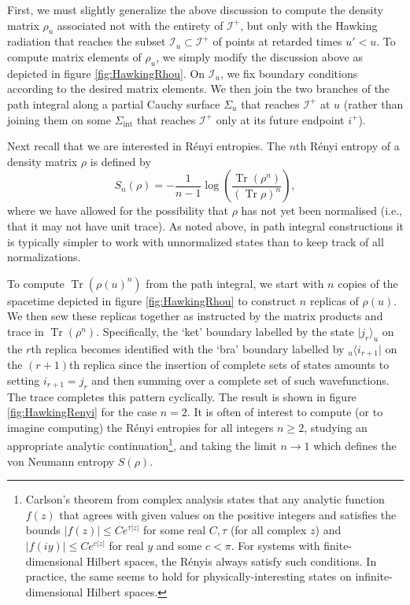 \documentclass[letterpaper,12pt]{article}
\DeclareMathOperator{\Tr}{Tr}
\newcommand*{\scri}{\mathscr{I}} %
\begin{document}
First, we must slightly generalize the above discussion to compute the density matrix $\rho_{u}$ associated not with the entirety of $\scri^+$, but only with the Hawking radiation that reaches the subset  $\scri_u \subset \scri^+$ of points at retarded times $u' < u$. To compute matrix elements of $\rho_{u}$, we simply modify the discussion above as depicted in figure \ref{fig:HawkingRhou}.
On $\scri_u$, we fix boundary conditions according to the desired matrix elements.  We then  join the two branches of the path integral along a partial Cauchy surface $\Sigma_u$ that reaches $\scri^+$ at $u$ (rather than joining them on some $\Sigma_\mathrm{int}$ that reaches $\scri^+$ only at its future endpoint $i^+$).

Next recall that we are interested in R\'enyi entropies.
The $n$th R\'enyi entropy of a density matrix $\rho$ is defined by
\begin{equation}
\label{eq:Renyis}
S_n(\rho) = -\frac{1}{n-1} \log \left(\frac{\Tr(\rho^n)}{\left( \Tr \rho \right)^n} \right),
\end{equation}
 where we have allowed for the possibility  that $\rho$ has not yet been normalised (i.e., that it may not have unit trace).
As noted above, in path integral constructions it is typically simpler to work with unnormalized states than to keep track of all normalizations.

To compute $\Tr(\rho(u)^n)$ from the path integral, we start with $n$ copies of the spacetime depicted in figure \ref{fig:HawkingRhou} to construct $n$ replicas of $\rho(u)$. We then sew these replicas together as instructed by the matrix products and trace in $\Tr(\rho^n)$. Specifically, the `ket' boundary labelled by the state $|j_r\rangle_u$ on the $r$th replica becomes identified with the `bra' boundary labelled by ${}_u\langle i_{r+1}|$ on the $(r+1)$th replica since the insertion of complete sets of states amounts to setting $i_{r+1}=j_r$ and then summing over a complete set of such wavefunctions. The trace completes this pattern cyclically. The result is shown in figure \ref{fig:HawkingRenyi} for the case $n=2$.  It is often of interest to compute (or to imagine computing) the R\'enyi entropies for all integers $n\ge 2$, studying an appropriate analytic continuation\footnote{Carlson's theorem from complex analysis states that any analytic function $f(z)$ that agrees with given values on the positive integers and satisfies the bounds $|f(z)| \le C e^{\tau |z|}$ for some real $C, \tau$ (for all complex $z$) and $|f(iy)| \le C e^{c|z|}$ for real $y$ and some $c<\pi$.  For systems with finite-dimensional Hilbert spaces, the R\'enyis always satisfy such conditions.  In practice, the same seems to hold for physically-interesting states on infinite-dimensional Hilbert spaces.}, and taking the limit $n \rightarrow 1$ which defines the von Neumann entropy $S(\rho)$.
\end{document}

